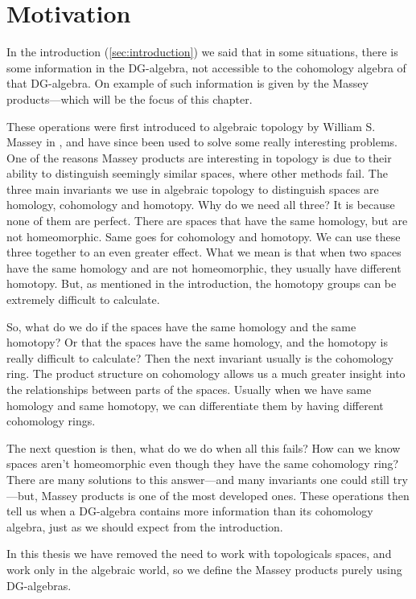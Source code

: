 
\section{Motivation}

In the introduction (\ref{sec:introduction}) we said that in some situations, there is some information in the DG-algebra, not accessible to the cohomology algebra of that DG-algebra. On example of such information is given by the Massey products---which will be the focus of this chapter. 

These operations were first introduced to algebraic topology by William S. Massey in \cite{massey}, and have since been used to solve some really interesting problems. One of the reasons Massey products are interesting in topology is due to their ability to distinguish seemingly similar spaces, where other methods fail. The three main invariants we use in algebraic topology to distinguish spaces are homology, cohomology and homotopy. Why do we need all three? It is because none of them are perfect. There are spaces that have the same homology, but are not homeomorphic. Same goes for cohomology and homotopy. We can use these three together to an even greater effect. What we mean is that when two spaces have the same homology and are not homeomorphic, they usually have different homotopy. But, as mentioned in the introduction, the homotopy groups can be extremely difficult to calculate. 

So, what do we do if the spaces have the same homology and the same homotopy? Or that the spaces have the same homology, and the homotopy is really difficult to calculate? Then the next invariant usually is the cohomology ring. The product structure on cohomology allows us a much greater insight into the relationships between parts of the spaces. Usually when we have same homology and same homotopy, we can differentiate them by having different cohomology rings. 

The next question is then, what do we do when all this fails? How can we know spaces aren't homeomorphic even though they have the same cohomology ring? There are many solutions to this answer---and many invariants one could still try---but, Massey products is one of the most developed ones. These operations then tell us when a DG-algebra contains more information than its cohomology algebra, just as we should expect from the introduction. 

In this thesis we have removed the need to work with topologicals spaces, and work only in the algebraic world, so we define the Massey products purely using DG-algebras.  

